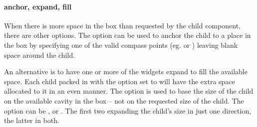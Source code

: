\paragraph{anchor, expand, fill} 
When there is more space in the box than requested by the child
component, there are other options. The  option
can be used to anchor the child to a place in the box by specifying
one of the valid compass points (eg.  or )
leaving blank space around the child. 


An alternative is to have one or more of the widgets expand to fill
the available space. Each child packed in with the 
option  set to  will have
the extra space allocated  to it in an even manner. The
 option is used to base the size of the child on
the available cavity in the box -- not on the requested size of the
child. The  option can be ,  or
. The first two expanding the child's size in just one
direction, the latter in both.

